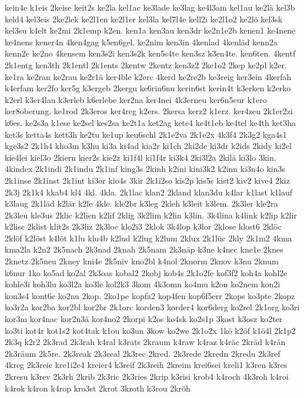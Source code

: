 {kein4e
k1eis
2keise
keit2s
ke2la
kel1ac
ke3lade
ke3lag
ke4l3am
kel1au
ke2lä
kel3b
keld4
kel3eis
2ke2lek
ke2l1en
ke2l1er
kel3la
kel7l4e
kell2i
ke2l1o2
ke2lö
kel3sk
kel3su
k4elt
ke2mi
2k1emp
k2en.
ken1a
ken3au
ken3dr
ke2n1e2b
kenen1
ke4nene
ke4nens
kener4n
4ken4gag
k5en6gel.
ke2nim
ken3in
4kenlad
4kenläd
kenn2a
kenn2e
ke2no
4kensem
ken3s2i
ken3s2k
ken5s4te
ken3sz
k3en4te.
ken6ten.
4kentf
2k1entg
ken3th
2k1entl
2k1ents
2kentw
2kentz
ken3z2
2ke1o2
2kep
ke2pl
k2er.
ke1ra
ke2ran
ke2rau
ke2r1ä
ker4ble
k2erc
4kerd
ke2re2b
ke3reig
ker3ein
4kerfah
k4erfam
ker2fo
ker5g
k3ergeb
2kergu
ke6rin6nu
kerin6st
kerin4t
k3erken
k2erko
k2erl
k3er4lau
k3erleb
k6erlebe
ker2na
ker4nei
4k3erneu
ker6n5eur
k1ero
ker8oberung.
ke1rod
2k3eros
ker4reg
k2ers.
2kersa
kerz2
k1erz.
ker4zeu
2k1er2zi
k6es.
ke2s3a
k1ese
ke2sel
kes2sa
ke2t1a
ket2ag
kete4
ke4t1eb
ke4tel
ke4th
ket3ha
ket3s
ketta4s
kett3h
ke2tu
ke1up
keu6schl
2k1e2va
2k1e2x
4k3f4
2k3g2
kga4s1
kge3s2
2k1h4
kho3m
k3hu
ki3a
ki4ad
kia2r
ki1ch
2ki2de
ki3dr
k2ids
2kidy
ki2el
kie4lei
kiel3o
2kiern
kier2s
kie2z
ki1f4l
ki1f4r
ki3k4
2ki3l2a
2kilä
ki3lo
3kin.
4kindex
2k1indi
2k1indu
2k1inf
king3s
2kinh
k2ini
kini3k2
k2inn
ki3n4o
kin3s
2k1inse
2k1inst
2k1int
ki3or
kio4s
3kir
2k1i2so
kis2p
kis5s
kist2
kiv2
kive4
2kiz
2k3j
2k1k4
kkab4
kl4
4kl.
4kla.
2k1lac
klan2
2kland
klan3du
k4lar
k1last
k1lauf
k3laug
2k1läd
k2lär
k2le
4kle.
kle2br
k3leg
2kleh
k3leit
k3lem.
2k3ler
kle2ra
2k3leu
kle3us
2klic
k2lien
k2lif
2klig
3k2lim
k2lin
k3lin.
3k4lina
k4link
k2lip
k2lir
k2lisc
2klist
klit2s
2k3liz
2k3loc
klo2i3
2klok
3k4lop
k3lor
2klose
klost6
2klöc
2klöf
k2löst
k4löt
k1lu
klu4b
k2lud
k2lug
k2lum
2klux
2k1lüc
2kly
2k1m2
4kma
kma2la
k2n2
2k5nach
2k3nad
2knah
2k5nam
2k3näp
k3ne
k4nec
kne1e
2knes
2knetz
2k5neu
2kney
kni4e
2k5niv
kno2bl
k4nol
2knorm
2knov
k3nu
2knum
k6nur
1ko
ko5ad
ko2al
2k3oas
kobal2
2kobj
kob4s
2k1o2fe
kof3f2
koh4a
kohl2e
kohle3i
koh3lu
ko3l2a
ko3le
kol2k3
3kom
4k3omn
ko4mu
k2on
ko2nem
kon2i
kon3s4
kont6e
ko2nu
2kop.
2ko1pe
kopfa2
kop4fen
kop6f5err
2kops
ko3pte
2kopz
ko3r2a
kor2ba
kor2bl
kor2br
2k1orc
korden3
korder4
kor6derg
ko2rel
2k1org
ko3ri
kor3m
kor4nac
kor2n3ä
kor4no2
2korpi
k2os
ko4sk
ko2s1p
3kost
k3osz
ko2ter
ko3ti
kot4r
kot1s2
kot4tak
k1ou
ko3un
3kow
ko2we
2k1o2x
1kö
k2öf
k1ö4l
2k1p2
2k3q
k2r2
2k3rad
2k3rah
k4ral
k3rats
2kraum
k4raw
k4raz
k4räc
2kräd
k4rän
2k3räum
2k5re.
2k3reak
2k3real
2k3rec
2kred.
2k3rede
2kredn
2kredu
2k3ref
4kreg
2k3reic
kre1i2e4
kreier4
k3reif
2k3reih
2kreim
krei6sei
kreli1
k3ren
k3res
2kresu
k3rev
2k3rh
2krib
2k3ric
2k3ries
2krip
k3risi
krob4
k4roch
4k3roh
k4roi
k4rok
k4ron
k4rop
kro3st
2krot
3kroth
k3rou
2kröh
}
